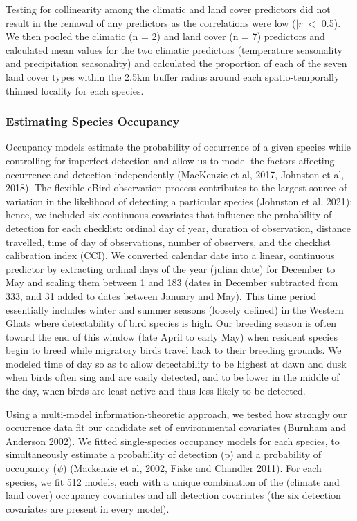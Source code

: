 Testing for collinearity among the climatic and land cover predictors did not result in the removal of any predictors as the correlations were low ($|r| <$ 0.5).
We then pooled the climatic (n = 2) and land cover (n = 7) predictors and calculated mean values for the two climatic predictors (temperature seasonality and precipitation seasonality) and calculated the proportion of each of the seven land cover types within the 2.5km buffer radius around each spatio-temporally thinned locality for each species.

\subsubsection*{Estimating Species Occupancy}

Occupancy models estimate the probability of occurrence of a given species while controlling for imperfect detection and allow us to model the factors affecting occurrence and detection independently (MacKenzie et al, 2017, Johnston et al, 2018).
The flexible eBird observation process contributes to the largest source of variation in the likelihood of detecting a particular species (Johnston et al, 2021); hence, we included six continuous covariates that influence the probability of detection for each checklist: ordinal day of year, duration of observation, distance travelled, time of day of observations, number of observers, and the checklist calibration index (CCI).
We converted calendar date into a linear, continuous predictor by extracting ordinal days of the year (julian date) for December to May and scaling them between 1 and 183 (dates in December subtracted from 333, and 31 added to dates between January and May).
This time period essentially includes winter and summer seasons (loosely defined) in the Western Ghats where detectability of bird species is high.
Our breeding season is often toward the end of this window (late April to early May) when resident species begin to breed while migratory birds travel back to their breeding grounds.
We modeled time of day so as to allow detectability to be highest at dawn and dusk when birds often sing and are easily detected, and to be lower in the middle of the day, when birds are least active and thus less likely to be detected.

Using a multi-model information-theoretic approach, we tested how strongly our occurrence data fit our candidate set of environmental covariates (Burnham and Anderson 2002).
We fitted single-species occupancy models for each species, to simultaneously estimate a probability of detection (p) and a probability of occupancy ($\psi$) (Mackenzie et al, 2002, Fiske and Chandler 2011).
For each species, we fit 512 models, each with a unique combination of the (climate and land cover) occupancy covariates and all detection covariates (the six detection covariates are present in every model).

